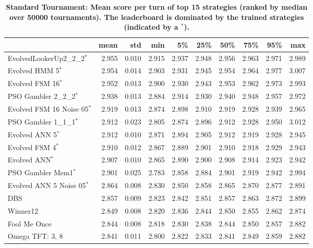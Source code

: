 \documentclass[10pt,letterpaper]{article}
\begin{document}
\begin{table}[!hbtp]
        \centering
        \footnotesize
        \caption{\bf Standard Tournament: Mean score per turn of top 15 strategies
            (ranked by median over 50000 tournaments).
        The leaderboard is dominated by the trained strategies (indicated by a
        $^{*}$).}
\begin{tabular}{lrrrrrrrrr}
\toprule
{} &   mean &    std &    min &     5\% &    25\% &    50\% &    75\% &    95\% &    max \\
\midrule
EvolvedLookerUp2\_2\_2$^{*}$    &  2.955 &  0.010 &  2.915 &  2.937 &  2.948 &  2.956 &  2.963 &  2.971 &  2.989 \\
Evolved HMM 5$^{*}$           &  2.954 &  0.014 &  2.903 &  2.931 &  2.945 &  2.954 &  2.964 &  2.977 &  3.007 \\
Evolved FSM 16$^{*}$          &  2.952 &  0.013 &  2.900 &  2.930 &  2.943 &  2.953 &  2.962 &  2.973 &  2.993 \\
PSO Gambler 2\_2\_2$^{*}$       &  2.938 &  0.013 &  2.884 &  2.914 &  2.930 &  2.940 &  2.948 &  2.957 &  2.972 \\
Evolved FSM 16 Noise 05$^{*}$ &  2.919 &  0.013 &  2.874 &  2.898 &  2.910 &  2.919 &  2.928 &  2.939 &  2.965 \\
PSO Gambler 1\_1\_1$^{*}$       &  2.912 &  0.023 &  2.805 &  2.874 &  2.896 &  2.912 &  2.928 &  2.950 &  3.012 \\
Evolved ANN 5$^{*}$           &  2.912 &  0.010 &  2.871 &  2.894 &  2.905 &  2.912 &  2.919 &  2.928 &  2.945 \\
Evolved FSM 4$^{*}$           &  2.910 &  0.012 &  2.867 &  2.889 &  2.901 &  2.910 &  2.918 &  2.929 &  2.943 \\
Evolved ANN$^{*}$             &  2.907 &  0.010 &  2.865 &  2.890 &  2.900 &  2.908 &  2.914 &  2.923 &  2.942 \\
PSO Gambler Mem1$^{*}$        &  2.901 &  0.025 &  2.783 &  2.858 &  2.884 &  2.901 &  2.919 &  2.942 &  2.994 \\
Evolved ANN 5 Noise 05$^{*}$  &  2.864 &  0.008 &  2.830 &  2.850 &  2.858 &  2.865 &  2.870 &  2.877 &  2.891 \\
DBS                           &  2.857 &  0.009 &  2.823 &  2.842 &  2.851 &  2.857 &  2.863 &  2.872 &  2.899 \\
Winner12                      &  2.849 &  0.008 &  2.820 &  2.836 &  2.844 &  2.850 &  2.855 &  2.862 &  2.874 \\
Fool Me Once                  &  2.844 &  0.008 &  2.818 &  2.830 &  2.838 &  2.844 &  2.850 &  2.857 &  2.882 \\
Omega TFT: 3, 8               &  2.841 &  0.011 &  2.800 &  2.822 &  2.833 &  2.841 &  2.849 &  2.859 &  2.882 \\
\bottomrule
\end{tabular}
        \label{tbl:standard_score}
\end{table}
\end{document}
